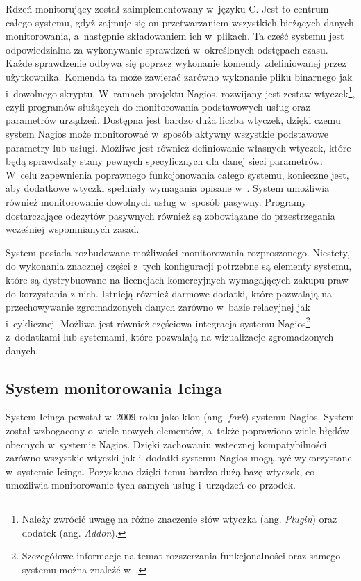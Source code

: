 Rdzeń monitorujący został zaimplementowany w~języku C. Jest to centrum
całego systemu, gdyż zajmuje się on przetwarzaniem wszystkich
bieżących danych monitorowania, a~następnie składowaniem ich
w~plikach. Ta cześć systemu jest odpowiedzialna za wykonywanie
sprawdzeń w~określonych odstępach czasu. Każde sprawdzenie odbywa się
poprzez wykonanie komendy zdefiniowanej przez użytkownika. Komenda ta
może zawierać zarówno wykonanie pliku binarnego jak i~dowolnego
skryptu. W~ramach projektu Nagios, rozwijany jest zestaw
wtyczek\footnote{Należy zwrócić uwagę na różne znaczenie słów wtyczka
  (ang. {\em Plugin}) oraz dodatek (ang. {\em Addon}). }, czyli
programów służących do monitorowania podstawowych usług oraz
parametrów urządzeń. Dostępna jest bardzo duża liczba wtyczek, dzięki
czemu system Nagios może monitorować w~sposób aktywny wszystkie
podstawowe parametry lub usługi. Możliwe jest również definiowanie
własnych wtyczek, które będą sprawdzały stany pewnych specyficznych
dla danej sieci parametrów. W~celu zapewnienia poprawnego
funkcjonowania całego systemu, konieczne jest, aby dodatkowe wtyczki
spełniały wymagania opisane w~\cite{www:NagiosPluginsTutorial}. System
umożliwia również monitorowanie dowolnych usług w~sposób
pasywny. Programy dostarczające odczytów pasywnych również są
zobowiązane do przestrzegania wcześniej wspomnianych zasad.

System posiada rozbudowane możliwości monitorowania
rozproszonego. Niestety, do wykonania znacznej części z~tych
konfiguracji potrzebne są elementy systemu, które są dystrybuowane na
licencjach komercyjnych wymagających zakupu praw do korzystania z
nich. Istnieją również darmowe dodatki, które pozwalają na
przechowywanie zgromadzonych danych zarówno w~bazie relacyjnej jak
i~cyklicznej. Możliwa jest również częściowa integracja systemu
Nagios\footnote{Szczegółowe informacje na temat rozszerzania
  funkcjonalności oraz samego systemu można znaleźć
  w~\cite{www:Nagios}.}  z~dodatkami lub systemami, które pozwalają na
wizualizacje zgromadzonych danych.

\subsection[Icinga][System monitorowania Icinga]{System monitorowania Icinga}
\label{subsec:Icinga}

System Icinga powstał w~2009 roku jako klon (ang. {\em fork}) systemu
Nagios. System został wzbogacony o~wiele nowych elementów, a~także
poprawiono wiele błędów obecnych w~systemie Nagios. Dzięki zachowaniu
wstecznej kompatybilności zarówno wszystkie wtyczki jak i~dodatki
systemu Nagios mogą być wykorzystane w~systemie Icinga. Pozyskano
dzięki temu bardzo dużą bazę wtyczek, co umożliwia monitorowanie tych
samych usług i~urządzeń co przodek.

